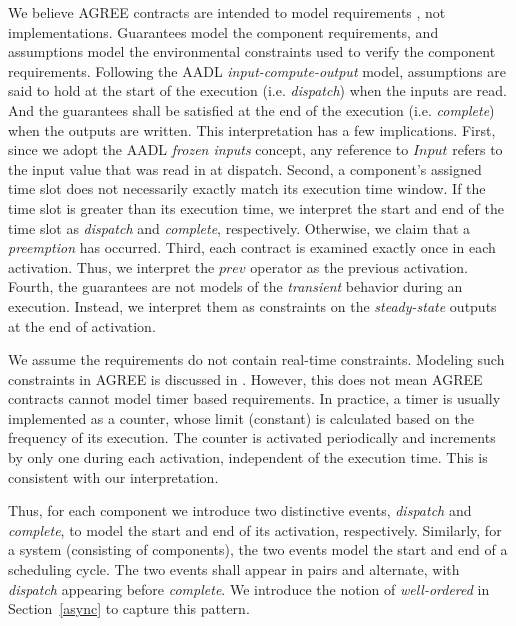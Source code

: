 We believe AGREE contracts are intended to model requirements \cite{AGREE2}, not implementations. Guarantees model the component requirements, and assumptions model the environmental constraints used to verify the component requirements. Following the AADL \emph{input-compute-output} model, assumptions are said to hold at the start of the execution (i.e. \emph{dispatch}) when the inputs are read. And the guarantees shall be satisfied at the end of the execution (i.e. \emph{complete}) when the outputs are written. This interpretation has a few implications. 
First, since we adopt the AADL \textit{frozen inputs} concept, any reference to $Input$ refers to the input value that was read in at dispatch.
Second, a component's assigned time slot does not necessarily exactly match its execution time window. If the time slot is greater than its execution time, we interpret the start and end of the time slot as \textit{dispatch} and \textit{complete}, respectively. Otherwise, we claim that a \textit{preemption} has occurred.
Third, each contract is examined exactly once in each activation. Thus, we interpret the $prev$ operator as the previous activation. 
Fourth, the guarantees are not models of the \emph{transient} behavior during an execution. Instead, we interpret them as constraints on the \emph{steady-state} outputs at the end of activation.

We assume the requirements do not contain real-time constraints. Modeling such constraints in AGREE is discussed in \cite{rtAGREE}.
However, this does not mean AGREE contracts cannot model timer based requirements. In practice, a timer is usually implemented as a counter, whose limit (constant) is calculated based on the frequency of its execution. The counter is activated periodically and increments by only one during each activation, independent of the execution time. This is consistent with our interpretation.

Thus, for each component we introduce two distinctive events, \emph{dispatch} and \emph{complete}, to model the start and end of its activation, respectively. 
Similarly, for a system (consisting of components), the two events model the start and end of a scheduling cycle. 
The two events shall appear in pairs and alternate, with \emph{dispatch} appearing before \emph{complete}. We introduce the notion of \emph{well-ordered} in Section~\ref{async} to capture this pattern.

